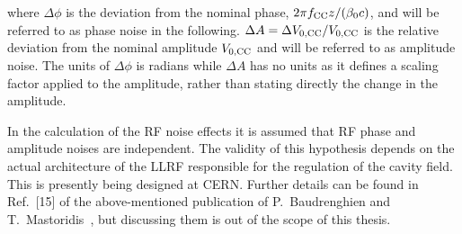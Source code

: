 where $\Delta \phi$ is the deviation from the nominal phase, $2\pi {f_\mathrm{CC}} z/(\beta_0 c)$, and will be referred to as phase noise in the following. $\Delta A = \Delta {V_\mathrm{0, CC}} / {V_\mathrm{0, CC}}$ is the relative deviation from the nominal amplitude ${V_\mathrm{0, CC}}$ and will be referred to as amplitude noise. The units of $\Delta \phi$ is radians while $\Delta A$ has no units as it defines a scaling factor applied to the amplitude, rather than stating directly the change in the amplitude.


In the calculation of the RF noise effects it is assumed that RF phase and amplitude noises are independent. The validity of this hypothesis depends on the actual architecture of the LLRF responsible for the regulation of the cavity field. This is presently being designed at CERN. Further details can be found in Ref.~[15] of the above-mentioned publication of P.~Baudrenghien and T.~Mastoridis~\cite{PhysRevSTAB.18.101001}, but discussing them is out of the scope of this thesis.
 

